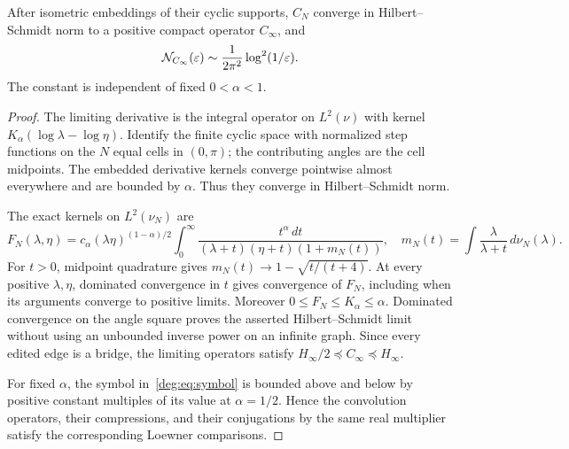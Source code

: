 \begin{theorem}\label{deg:thm:center}
After isometric embeddings of their cyclic supports, $C_N$ converge
in Hilbert--Schmidt norm to a positive compact operator $C_\infty$,
and
\[
 \mathcal N_{C_\infty}(\varepsilon)
             \sim\frac1{2\pi^2}\log^2(1/\varepsilon).
\]
The constant is independent of fixed $0<\alpha<1$.
\end{theorem}
\begin{proof}
The limiting derivative is the integral operator on $L^2(\nu)$ with
kernel $K_\alpha(\log\lambda-\log\eta)$.
Identify the finite cyclic space with normalized step functions on the
$N$ equal cells in $(0,\pi)$; the contributing angles are the cell
midpoints. The embedded derivative kernels converge pointwise almost
everywhere and are bounded by $\alpha$. Thus they converge in
Hilbert--Schmidt norm.

The exact kernels on $L^2(\nu_N)$ are
\[
 F_N(\lambda,\eta)=c_\alpha(\lambda\eta)^{(1-\alpha)/2}
 \int_0^\infty\frac{t^\alpha\,dt}
 {(\lambda+t)(\eta+t)(1+m_N(t))},\quad
 m_N(t)=\int\frac{\lambda}{\lambda+t}\,d\nu_N(\lambda).
\]
For $t>0$, midpoint quadrature gives
$m_N(t)\to1-\sqrt{t/(t+4)}$.
At every positive $\lambda,\eta$, dominated convergence in $t$
gives convergence of $F_N$, including when its arguments converge to
positive limits. Moreover $0\le F_N\le K_\alpha\le\alpha$.
Dominated convergence on the angle square proves the asserted
Hilbert--Schmidt limit without using an unbounded inverse power on an
infinite graph. Since every edited edge is a bridge, the limiting
operators satisfy $H_\infty/2\preceq C_\infty\preceq H_\infty$.

For fixed $\alpha$, the symbol in~\eqref{deg:eq:symbol} is bounded above and below by positive
constant multiples of its value at $\alpha=1/2$.
Hence the convolution operators, their compressions, and their
conjugations by the same real multiplier satisfy the corresponding
Loewner comparisons.


\end{proof}
